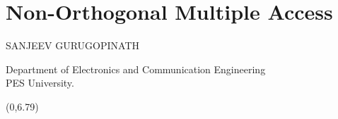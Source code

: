\chapter{Non-Orthogonal Multiple Access}

\begin{center}
{\large\uppercase{Sanjeev Gurugopinath}} 

\vskip -6pt

Department of Electronics and Communication Engineering\\ 
PES University.
\end{center}
\vskip 1cm


\begin{textblock}{16}(0,6.79)
\noindent{}
\end{textblock}
\newpage

